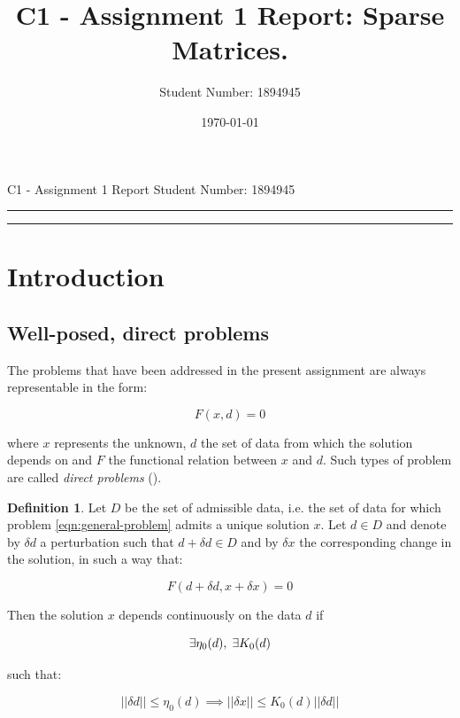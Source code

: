 \documentclass[11pt]{article}
\title{C1 - Assignment 1 Report: Sparse Matrices.} %
\author{Student Number: 1894945} %
\date{\today} %
\theoremstyle{theorem}
\theoremstyle{definition}
\newtheorem{definition}{Definition}
\begin{document}
\maketitle %

\begin{center}
C1 - Assignment 1 Report \hfill
Student Number: 1894945
\vspace{3pt} \hrule \vspace{3pt} \hrule
\end{center}

\tableofcontents

\clearpage



\section{Introduction}

\subsection{Well-posed, direct problems}
The problems that have been addressed in the present assignment are always representable in the form: 

\begin{equation}
	\label{eqn:general-problem}
	F(x, d) = 0
\end{equation}

where $x$ represents the unknown, $d$ the set of data from which the solution depends on and $F$ the functional relation between $x$ and $d$. Such types of problem are called \emph{direct problems} (\cite{numerical-math}).\\

\begin{definition}
	\label{defn:cont-dep}
	Let $D$ be the set of admissible data, i.e. the set of data for which problem \eqref{eqn:general-problem} admits a unique solution $x$. Let $d\in D$ and denote by $\delta d$ a perturbation such that $d + \delta d\in D$ and by $\delta x$ the corresponding change in the solution, in such a way that:
	
	$$F(d+\delta d, x+\delta x) = 0$$
	
	Then the solution $x$ depends continuously on the data $d$ if
	
	$$\exists\eta_0(d),\hspace{1mm}\exists K_0(d)$$ 
	
	such that:
	
	$$||\delta d||\le\eta_0(d)\implies ||\delta x||\le K_0(d)||\delta d||$$
	 
\end{definition}
\end{document}
